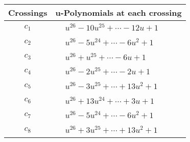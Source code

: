 \documentclass[1p]{elsarticle_modified}
\theoremstyle{definition}
\begin{document}
\begin{tabular}{m{50pt}|m{274pt}}
Crossings & \hspace{64pt}u-Polynomials at each crossing \\
\hline $$\begin{aligned}c_{1}\end{aligned}$$&$\begin{aligned}
&u^{26}-10 u^{25}+\cdots-12 u+1
\end{aligned}$\\
\hline $$\begin{aligned}c_{2}\end{aligned}$$&$\begin{aligned}
&u^{26}-5 u^{24}+\cdots-6 u^2+1
\end{aligned}$\\
\hline $$\begin{aligned}c_{3}\end{aligned}$$&$\begin{aligned}
&u^{26}+u^{25}+\cdots-6 u+1
\end{aligned}$\\
\hline $$\begin{aligned}c_{4}\end{aligned}$$&$\begin{aligned}
&u^{26}-2 u^{25}+\cdots-2 u+1
\end{aligned}$\\
\hline $$\begin{aligned}c_{5}\end{aligned}$$&$\begin{aligned}
&u^{26}-3 u^{25}+\cdots+13 u^2+1
\end{aligned}$\\
\hline $$\begin{aligned}c_{6}\end{aligned}$$&$\begin{aligned}
&u^{26}+13 u^{24}+\cdots+3 u+1
\end{aligned}$\\
\hline $$\begin{aligned}c_{7}\end{aligned}$$&$\begin{aligned}
&u^{26}-5 u^{24}+\cdots-6 u^2+1
\end{aligned}$\\
\hline $$\begin{aligned}c_{8}\end{aligned}$$&$\begin{aligned}
&u^{26}+3 u^{25}+\cdots+13 u^2+1
\end{aligned}$\\

\end{tabular}
\end{document}
